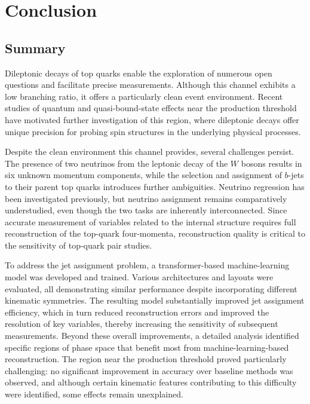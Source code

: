 \chapter{Conclusion}
\label{chap:conclusion}
\section{Summary}
\label{sec:summary}

Dileptonic decays of top quarks enable the exploration of numerous open questions and facilitate precise measurements. Although this channel exhibits a low branching ratio, it offers a particularly clean event environment. Recent studies of quantum and quasi-bound-state effects near the production threshold have motivated further investigation of this region, where dileptonic decays offer unique precision for probing spin structures in the underlying physical processes.

Despite the clean environment this channel provides, several challenges persist. The presence of two neutrinos from the leptonic decay of the $W$ bosons results in six unknown momentum components, while the selection and assignment of $b$-jets to their parent top quarks introduces further ambiguities. Neutrino regression has been investigated previously, but neutrino assignment remains comparatively understudied, even though the two tasks are inherently interconnected. Since accurate measurement of variables related to the internal structure requires full reconstruction of the top-quark four-momenta, reconstruction quality is critical to the sensitivity of top-quark pair studies.

To address the jet assignment problem, a transformer-based machine-learning model was developed and trained. Various architectures and layouts were evaluated, all demonstrating similar performance despite incorporating different kinematic symmetries. The resulting model substantially improved jet assignment efficiency, which in turn reduced reconstruction errors and improved the resolution of key variables, thereby increasing the sensitivity of subsequent measurements. Beyond these overall improvements, a detailed analysis identified specific regions of phase space that benefit most from machine-learning-based reconstruction. The region near the production threshold proved particularly challenging: no significant improvement in accuracy over baseline methods was observed, and although certain kinematic features contributing to this difficulty were identified, some effects remain unexplained.

